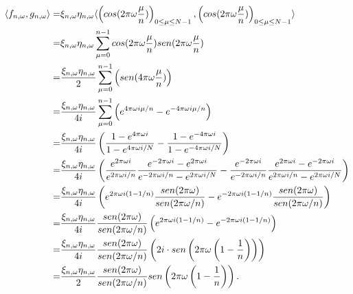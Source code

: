 \begin{align*}
\langle f_{n,\omega} , g_{n, \omega} \rangle = &
\xi_{n, \omega} \eta_{n, \omega} \langle 
\left( cos (2 \pi \omega \frac{\mu }{n}) \right)_{0 \leq \mu \leq N-1} ,  
\left( cos (2 \pi \omega \frac{\mu }{n}) \right)_{0 \leq \mu \leq N-1} \rangle \\
= & \xi_{n, \omega} \eta_{n, \omega} \sum\limits_{\mu=0}^{n-1}
cos (2 \pi \omega \frac{\mu }{n}) sen(2 \pi \omega \frac{\mu }{n}) \\
= & \frac{\xi_{n, \omega} \eta_{n, \omega}}{2}
\sum\limits_{\mu=0}^{n-1}
\left( sen(4 \pi \omega \frac{\mu}{n}) \right) \\
= & \frac{\xi_{n, \omega} \eta_{n, \omega}}{4i} \sum\limits_{\mu=0}^{n-1}
\left( e^{4 \pi \omega i \mu/n} - 
e^{-4 \pi \omega i \mu/n} \right) \\
= & \frac{\xi_{n, \omega} \eta_{n, \omega}}{4i} 
\left(
\frac{1-e^{4 \pi \omega i }}{1-e^{4 \pi \omega i /N}} - 
\frac{1-e^{-4 \pi \omega i }}{1-e^{-4 \pi \omega i /N}} 
\right) \\
= & \frac{\xi_{n, \omega} \eta_{n, \omega}}{4i} 
\left(
\frac{e^{2 \pi \omega i }}{e^{2 \pi \omega i/n }}
\frac{e^{-2 \pi \omega i }-e^{2 \pi \omega i }}{e^{-2 \pi \omega i/n }-e^{2 \pi \omega i /N}} - 
\frac{e^{-2 \pi \omega i }}{e^{-2 \pi \omega i/n }}
\frac{e^{2 \pi \omega i }-e^{-2 \pi \omega i }}{e^{2 \pi \omega i/n }-e^{2 \pi \omega i /N}} 
\right) \\
= & 
\frac{\xi_{n, \omega} \eta_{n, \omega}}{4i} 
\left(
e^{2 \pi \omega i \left( 1-1/n \right)}
\frac{sen(2 \pi \omega)}{sen(2 \pi \omega /n)} - 
e^{-2 \pi \omega i \left( 1-1/n \right)}
\frac{sen(2 \pi \omega)}{sen(2 \pi \omega /n)}
\right) 
\\
= & 
\frac{\xi_{n, \omega} \eta_{n, \omega}}{4i} 
\frac{sen(2 \pi \omega)}{sen(2 \pi \omega /n)}
\left(
e^{2 \pi \omega i \left( 1-1/n \right)} - e^{-2 \pi \omega i \left( 1-1/n \right)}
\right) \\
= &
\frac{\xi_{n, \omega} \eta_{n, \omega}}{4i} 
\frac{sen(2 \pi \omega)}{sen(2 \pi \omega /n)}
\left(
2i \cdot  sen \left( 2 \pi \omega  \left( 1- \frac{1}{n} \right) \right)
\right)\\
= & 
\frac{\xi_{n, \omega} \eta_{n, \omega}}{2} 
\frac{sen(2 \pi \omega)}{sen(2 \pi \omega /n)}
sen \left( 2 \pi \omega  \left( 1- \frac{1}{n} \right) \right). \\
\end{align*}


\QEDB
\vspace{0.2cm}


